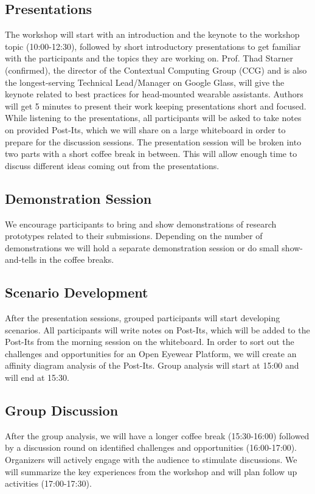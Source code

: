 \documentclass{sigchi-ext}
\begin{document}
\subsection{Presentations}
The workshop will start with an introduction and the keynote to the workshop topic (10:00-12:30), followed by short introductory presentations to get familiar with the participants and the topics they are working on. 
Prof. Thad Starner (confirmed), the director of the Contextual Computing Group (CCG) and is also the longest-serving Technical Lead/Manager on Google Glass, will give the keynote related to best practices for head-mounted wearable assistants.
Authors will get 5 minutes to present their work keeping presentations short and focused. While listening to the presentations, all participants will be asked to take notes on provided Post-Its, which we will share on a large whiteboard in order to prepare for the discussion sessions.
The presentation session will be broken into two parts with a short coffee break in between. This will allow enough time to discuss different ideas coming out from the presentations.

\subsection{Demonstration Session}
We encourage participants to bring and show demonstrations of research prototypes related to their submissions. Depending on the number of demonstrations we will hold a separate demonstration session or do small show-and-tells in the coffee breaks.

\subsection{Scenario Development}
After the presentation sessions, grouped participants will start developing scenarios. All participants will write notes on Post-Its, which will be added to the Post-Its from the morning session on the whiteboard. In order to sort out the challenges and opportunities for an Open Eyewear Platform, we will create an affinity diagram analysis of the Post-Its. Group analysis will start at 15:00 and will end at 15:30.

\subsection{Group Discussion}
After the group analysis, we will have a longer coffee break (15:30-16:00) followed by a discussion round on identified challenges and opportunities (16:00-17:00). Organizers will actively engage with the audience to stimulate discussions. We will summarize the key experiences from the workshop and will plan follow up activities (17:00-17:30).
\end{document}
